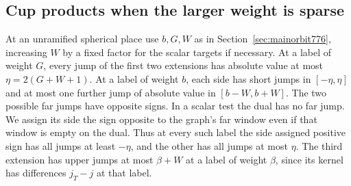 \documentclass[a4paper,11pt]{article}
\theoremstyle{definition}
\theoremstyle{remark}
\numberwithin{equation}{section}
\begin{document}
\subsection{Cup products when the larger weight is sparse}
\label{sec:sparsecups780}
At an unramified spherical place use \(b,G,W\) as in
Section~\ref{sec:mainorbit776}, increasing \(W\) by a fixed
factor for the scalar targets if necessary. At a label of
weight \(G\), every jump of the first two extensions has
absolute value at most \(\eta=2(G+W+1)\).
At a label of weight \(b\), each side has short jumps in
\([-\eta,\eta]\) and at most one further jump of absolute
value in \([b-W,b+W]\). The two possible far jumps have
opposite signs. In a scalar test the dual has no far jump.
We assign its side the sign opposite to the graph's far
window even if that window is empty on the dual. Thus at
every such label the side assigned positive sign has all
jumps at least \(-\eta\), and the other has all jumps at
most \(\eta\). The third extension has upper jumps at most
\(\beta+W\) at a label of weight \(\beta\), since its
kernel has differences \(j_T-j\) at that label.
\end{document}
